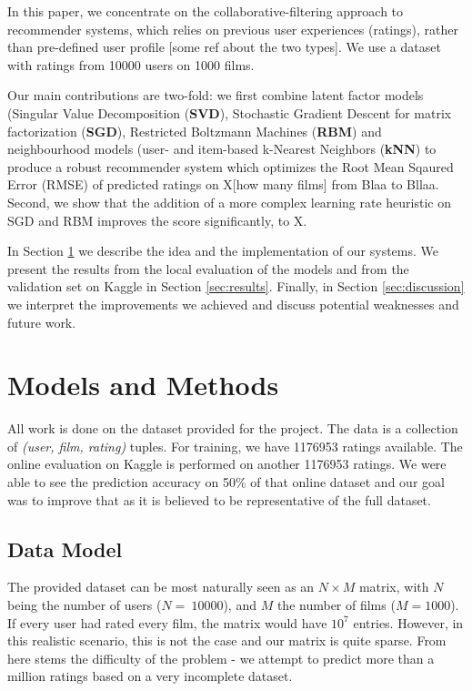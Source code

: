 \documentclass[10pt,conference,compsocconf]{IEEEtran}
\begin{document}
In this paper, we concentrate on the collaborative-filtering approach to recommender systems, which relies on previous user experiences (ratings), rather than pre-defined user profile [some ref about the two types]. We use a dataset with ratings from 10000 users on 1000 films.

Our main contributions are two-fold: we first combine latent factor models (Singular Value Decomposition (\textbf{SVD}), Stochastic Gradient Descent for matrix factorization (\textbf{SGD}), Restricted Boltzmann Machines (\textbf{RBM}) and neighbourhood models (user- and item-based k-Nearest Neighbors (\textbf{kNN}) to produce a robust recommender system which optimizes the Root Mean Sqaured Error (RMSE) of predicted ratings on X[how many films] from Blaa to Bllaa. Second, we show that the addition of a more complex learning rate heuristic on SGD and RBM improves the score significantly, to X. 

In Section \ref{sec:models} we describe the idea and the implementation of our systems. We present the results from the local evaluation of the models and from the validation set on Kaggle in Section \ref{sec:results}. Finally, in Section \ref{sec:discussion} we interpret the improvements we achieved and discuss potential weaknesses and future work.



\section{Models and Methods}
\label{sec:models}
All work is done on the dataset provided for the project. The data is a collection of \textit{(user, film, rating)} tuples. For training, we have 1176953 ratings available. The online evaluation on Kaggle is performed on another 1176953 ratings. We were able to see the prediction accuracy on 50\% of that online dataset and our goal was to improve that as it is believed to be representative of the full dataset.
\subsection{Data Model}

The provided dataset can be most naturally seen as an $N\times M$ matrix, with $N$ being the number of users ($N=~10000$), and $M$ the number of films ($M=1000$). If every user had rated every film, the matrix would have $10^7$ entries. However, in this realistic scenario, this is not the case and our matrix is quite sparse. From here stems the difficulty of the problem - we attempt to predict more than a million ratings based on a very incomplete dataset. 
\end{document}
